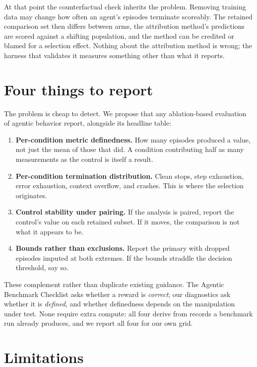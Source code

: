 \documentclass{article}
\begin{document}
At that point the counterfactual check inherits the problem. Removing training data may
change how often an agent's episodes terminate scoreably. The retained comparison set
then differs between arms, the attribution method's predictions are scored against a
shifting population, and the method can be credited or blamed for a selection effect.
Nothing about the attribution method is wrong; the harness that validates it measures
something other than what it reports.

\section{Four things to report}

The problem is cheap to detect. We propose that any ablation-based evaluation of
agentic behavior report, alongside its headline table:

\begin{enumerate}
\item \textbf{Per-condition metric definedness.} How many episodes produced a value,
not just the mean of those that did. A condition contributing half as many measurements
as the control is itself a result.
\item \textbf{Per-condition termination distribution.} Clean stops, step exhaustion,
error exhaustion, context overflow, and crashes. This is where the selection
originates.
\item \textbf{Control stability under pairing.} If the analysis is paired, report the
control's value on each retained subset. If it moves, the comparison is not what it
appears to be.
\item \textbf{Bounds rather than exclusions.} Report the primary with dropped episodes
imputed at both extremes. If the bounds straddle the decision threshold, say so.
\end{enumerate}

These complement rather than duplicate existing guidance. The Agentic Benchmark
Checklist \citep{zhu2025abc} asks whether a reward is \emph{correct}; our diagnostics
ask whether it is \emph{defined}, and whether definedness depends on the manipulation
under test. None require extra compute: all four derive from records a benchmark run
already produces, and we report all four for our own grid.

\section{Limitations}
\end{document}
